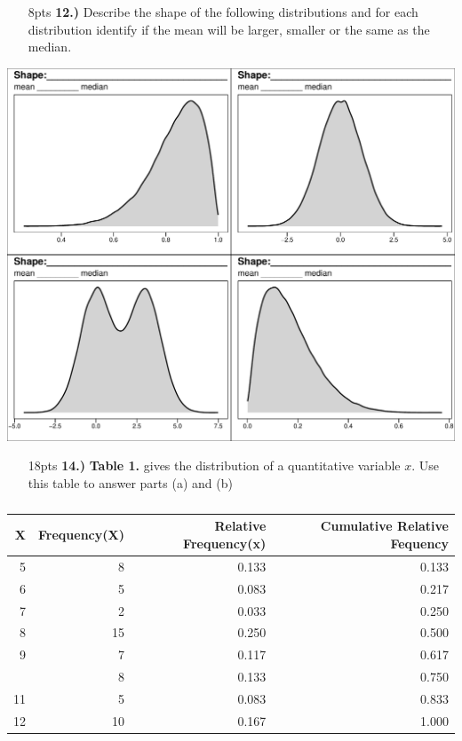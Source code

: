 \documentclass[
]{article}
\begin{document}
\newpage
\begin{enumerate}
\item[8pts \bf 12.)]{Describe the shape of the following distributions and for each distribution identify if the mean will be larger, smaller or the same as the median.}
\end{enumerate}

\includegraphics{Exam_1_Version_A_files/figure-latex/unnamed-chunk-4-1.pdf}

\newpage
\begin{enumerate}
\item[18pts \bf 14.)] \textbf{Table 1.} gives the distribution of a quantitative variable $x$. Use this table to answer parts (a) and (b)
\end{enumerate}

\begin{table}

\caption{\label{tab:unnamed-chunk-5}}
\centering
\begin{tabular}[t]{rrrr}
\toprule
X & Frequency(X) & Relative Frequency(x) & Cumulative Relative Fequency\\
\midrule
5 & 8 & 0.133 & 0.133\\
6 & 5 & 0.083 & 0.217\\
7 & 2 & 0.033 & 0.250\\
8 & 15 & 0.250 & 0.500\\
9 & 7 & 0.117 & 0.617\\
\addlinespace
10 & 8 & 0.133 & 0.750\\
11 & 5 & 0.083 & 0.833\\
12 & 10 & 0.167 & 1.000\\
\bottomrule
\end{tabular}
\end{table}
\end{document}
